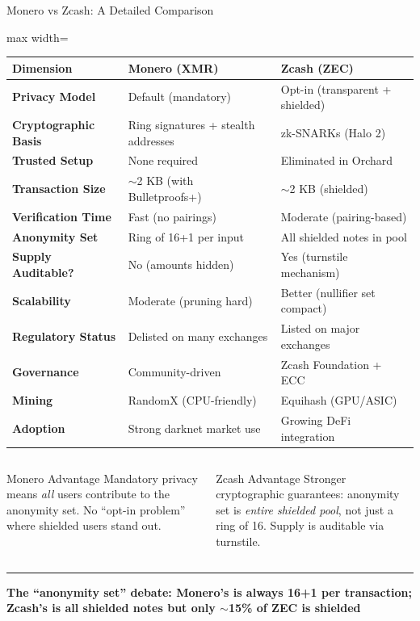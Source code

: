 \documentclass[8pt,aspectratio=169]{beamer}
\newcommand{\bottomnote}[1]{\vfill\vspace{-2mm}\textcolor{mllavender2}{\rule{\textwidth}{0.4pt}}\vspace{1mm}\footnotesize\textbf{#1}}
\begin{document}
\begin{frame}{Monero vs Zcash: A Detailed Comparison}
\footnotesize
\begin{center}
\begin{adjustbox}{max width=\textwidth}
\begin{tabular}{l l l}
\toprule
\textbf{Dimension} & \textbf{Monero (XMR)} & \textbf{Zcash (ZEC)} \\
\midrule
\textbf{Privacy Model} & \textcolor{mlgreen}{Default (mandatory)} & Opt-in (transparent + shielded) \\
\textbf{Cryptographic Basis} & Ring signatures + stealth addresses & zk-SNARKs (Halo 2) \\
\textbf{Trusted Setup} & \textcolor{mlgreen}{None required} & Eliminated in Orchard \\
\textbf{Transaction Size} & $\sim$2 KB (with Bulletproofs+) & $\sim$2 KB (shielded) \\
\textbf{Verification Time} & Fast (no pairings) & Moderate (pairing-based) \\
\textbf{Anonymity Set} & Ring of 16+1 per input & \textcolor{mlgreen}{All shielded notes in pool} \\
\textbf{Supply Auditable?} & \textcolor{mlred}{No} (amounts hidden) & \textcolor{mlgreen}{Yes} (turnstile mechanism) \\
\textbf{Scalability} & Moderate (pruning hard) & Better (nullifier set compact) \\
\textbf{Regulatory Status} & Delisted on many exchanges & Listed on major exchanges \\
\textbf{Governance} & Community-driven & Zcash Foundation + ECC \\
\textbf{Mining} & RandomX (CPU-friendly) & Equihash (GPU/ASIC) \\
\textbf{Adoption} & Strong darknet market use & Growing DeFi integration \\
\bottomrule
\end{tabular}
\end{adjustbox}
\end{center}
\vspace{0.2cm}
\begin{columns}[T]
\begin{block}{\footnotesize Monero Advantage}
\footnotesize
Mandatory privacy means \emph{all} users contribute to the anonymity set. No ``opt-in problem'' where shielded users stand out.
\end{block}
\begin{block}{\footnotesize Zcash Advantage}
\footnotesize
Stronger cryptographic guarantees: anonymity set is \emph{entire shielded pool}, not just a ring of 16. Supply is auditable via turnstile.
\end{block}
\end{columns}
\bottomnote{The ``anonymity set'' debate: Monero's is always 16+1 per transaction; Zcash's is all shielded notes but only $\sim$15\% of ZEC is shielded}
\end{frame}
\end{document}
